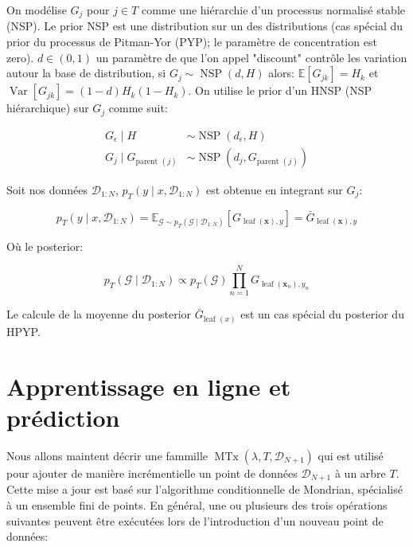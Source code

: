 On modélise $G_j$ pour $j \in T$ comme une hiérarchie d'un processus normalisé stable (NSP). Le prior NSP est une distribution sur un des distributions (cas spécial du prior du processus de Pitman-Yor (PYP); le paramètre de concentration est zero). $d\in(0,1)$ un paramètre de que l'on appel "discount" contrôle les variation autour la base de distribution, si $G_{j} \sim \operatorname{NSP}(d, H)$ alors: $\mathbb{E}\left[G_{j k}\right]=H_{k}$ et $\operatorname{Var}\left[G_{j k}\right]=(1-d) H_{k}\left(1-H_{k}\right) .$ On utilise le prior d'un HNSP (NSP hiérarchique) sur $G_{j}$ comme suit:

$$
\begin{aligned}
G_{\epsilon} \mid H &\sim \operatorname{NSP}\left(d_{\epsilon}, H\right)\\
G_{j} \mid G_{\text {parent }(j)} &\sim \operatorname{NSP}\left(d_{j}, G_{\text {parent }(j)}\right)
\end{aligned}
$$

Soit nos données $\mathcal{D}_{1:N}$, 
$p_{T}\left(y \mid x, \mathcal{D}_{1: N}\right)$ est obtenue en integrant sur $G_j$:

$$
p_{T}\left(y \mid x, \mathcal{D}_{1: N}\right)=\mathbb{E}_{\mathcal{G} \sim p_{T}\left(\mathcal{G} \mid \mathcal{D}_{1: N}\right)}\left[G_{\operatorname{leaf}(\boldsymbol{x}), y}\right]=\bar{G}_{\operatorname{leaf}(\boldsymbol{x}), y}
$$

Où le posterior:

$$
p_{T}\left(\mathcal{G} \mid \mathcal{D}_{1: N}\right) \propto p_{T}(\mathcal{G}) \prod_{n=1}^{N} G_{\operatorname{leaf}\left(\boldsymbol{x}_{n}\right), y_{n}}
$$

Le calcule de la moyenne du posterior
$\bar{G}_{\text {leaf }(x)}$ est un cas spécial du posterior du HPYP.

\newpage

\section{Apprentissage en ligne et prédiction}

Nous allons maintent décrir une fammille $\operatorname{MTx}\left(\lambda, T, \mathcal{D}_{N+1}\right)$
qui est utilisé pour  ajouter de manière incrémentielle un point de données $\mathcal{D}_{N+1}$ à un arbre $T$. Cette mise a jour est basé sur l'algorithme  conditionnelle de Mondrian, spécialisé à un ensemble fini de points. En général, une ou plusieurs des trois opérations suivantes peuvent être exécutées lors de l'introduction d'un nouveau point de données:

